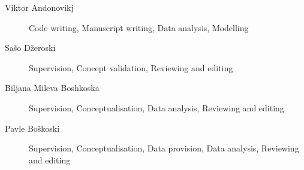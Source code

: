 \documentclass{article}
\begin{document}
\begin{description}
\item[Viktor Andonovikj] Code writing, Manuscript writing, Data analysis, Modelling

\item[Sa\v{s}o D\v{z}eroski] Supervision, Concept validation, Reviewing and editing

\item[Biljana Mileva Boshkoska] Supervision, Conceptualisation, Data analysis, Reviewing and editing

\item[Pavle Bo\v{s}koski]  Supervision, Conceptualisation, Data provision, Data analysis, Reviewing and editing

\end{description}
\end{document}
